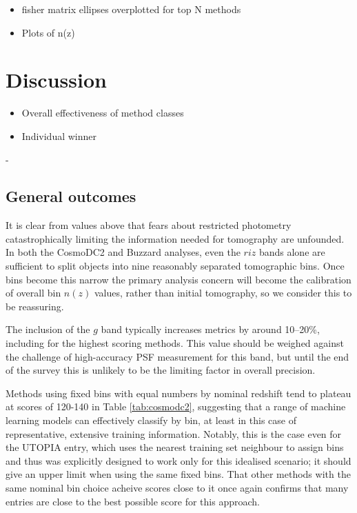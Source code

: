 \documentclass[twocolumn,twocolappendix]{aastex63}
\begin{document}
\begin{itemize}
    \item fisher matrix ellipses overplotted for top N methods
    \item Plots of n(z)
\end{itemize}

\section{Discussion}
\begin{itemize}
    \item Overall effectiveness of method classes
    \item Individual winner
\end{itemize}

- 

\subsection{General outcomes}
It is clear from values above that fears about restricted photometry catastrophically limiting
the information needed for tomography are unfounded.  In both the CosmoDC2 and Buzzard analyses,
even the $riz$ bands alone are sufficient to split objects into nine reasonably separated
tomographic bins.  Once bins become this narrow the primary analysis concern will become the calibration of overall
bin $n(z)$ values, rather than initial tomography, so we consider this to be reassuring.

The inclusion of the $g$ band typically increases metrics by around 10--20\%, including for the
highest scoring methods.  This value should be weighed against the challenge of high-accuracy
PSF measurement for this band, but until the end of the survey this is unlikely to be
the limiting factor in overall precision.

Methods using fixed bins with equal numbers by nominal redshift tend to plateau at scores of
120-140 in Table \ref{tab:cosmodc2}, suggesting that a range of machine learning models can
effectively classify by bin, at least in this case of representative, extensive training
information.  Notably, this is the case even for the UTOPIA entry, which uses the nearest 
training set neighbour to assign bins and thus was explicitly designed to work only
for this idealised scenario; it should give an upper limit when using the same fixed bins.
That other methods with the same nominal bin choice acheive scores close to it once again
confirms that many entries are close to the best possible score for this approach.
\end{document}
